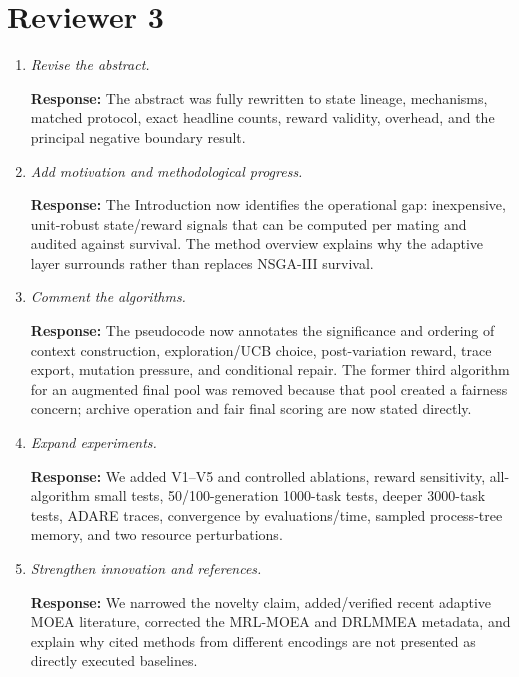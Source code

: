\documentclass[11pt]{article}
\newcommand{\response}[1]{\par\smallskip\noindent\textcolor{blue!55!black}{\textbf{Response:} #1}\par\medskip}
\begin{document}
\section*{Reviewer 3}
\begin{enumerate}
\item \emph{Revise the abstract.}
\response{The abstract was fully rewritten to state lineage, mechanisms, matched protocol, exact headline counts, reward validity, overhead, and the principal negative boundary result.}

\item \emph{Add motivation and methodological progress.}
\response{The Introduction now identifies the operational gap: inexpensive, unit-robust state/reward signals that can be computed per mating and audited against survival. The method overview explains why the adaptive layer surrounds rather than replaces NSGA-III survival.}

\item \emph{Comment the algorithms.}
\response{The pseudocode now annotates the significance and ordering of context construction, exploration/UCB choice, post-variation reward, trace export, mutation pressure, and conditional repair. The former third algorithm for an augmented final pool was removed because that pool created a fairness concern; archive operation and fair final scoring are now stated directly.}

\item \emph{Expand experiments.}
\response{We added V1--V5 and controlled ablations, reward sensitivity, all-algorithm small tests, 50/100-generation 1000-task tests, deeper 3000-task tests, ADARE traces, convergence by evaluations/time, sampled process-tree memory, and two resource perturbations.}

\item \emph{Strengthen innovation and references.}
\response{We narrowed the novelty claim, added/verified recent adaptive MOEA literature, corrected the MRL-MOEA and DRLMMEA metadata, and explain why cited methods from different encodings are not presented as directly executed baselines.}
\end{enumerate}
\end{document}
